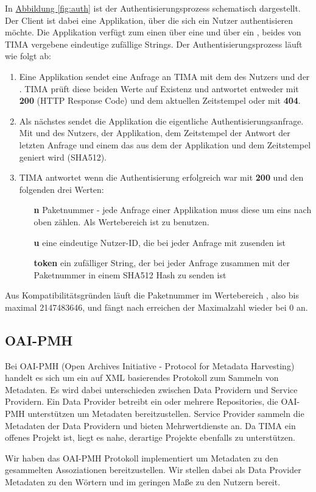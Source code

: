 In \hyperref[fig:auth]{Abbildung \ref*{fig:auth}} ist der Authentisierungsprozess schematisch dargestellt. Der Client ist dabei eine Applikation, über die sich ein Nutzer authentisieren möchte. Die Applikation verfügt zum einen über eine  und über ein , beides von TIMA vergebene eindeutige zufällige Strings. Der Authentisierungsprozess läuft wie folgt ab:
\begin{enumerate}
	\item Eine Applikation sendet eine Anfrage an TIMA mit dem  des Nutzers und der . TIMA prüft diese beiden Werte auf Existenz und antwortet entweder mit \textbf{200} (HTTP Response Code) und dem aktuellen Zeitstempel oder mit \textbf{404}.
	\item Als nächstes sendet die Applikation die eigentliche Authentisierungsanfrage. Mit  und  des Nutzers,  der Applikation, dem Zeitstempel der Antwort der letzten Anfrage und einem  das aus dem  der Applikation und dem Zeitstempel geniert wird (SHA512).
	\item TIMA antwortet wenn die Authentisierung erfolgreich war mit \textbf{200} und den folgenden drei Werten:
	\begin{itemize}
    \item[\textbf{n}] Paketnummer - jede Anfrage einer Applikation muss diese um eins nach oben zählen. Als Wertebereich ist  zu benutzen.
    \item[\textbf{u}] eine eindeutige Nutzer-ID, die bei jeder Anfrage mit zusenden ist
    \item[\textbf{token}] ein zufälliger String, der bei jeder Anfrage zusammen mit der Paketnummer  in einem SHA512 Hash zu senden ist
	\end{itemize}
\end{enumerate}

Aus Kompatibilitätsgründen läuft die Paketnummer im Wertebereich , also bis maximal 2147483646, und fängt nach erreichen der Maximalzahl wieder bei 0 an.

\subsection{OAI-PMH}\label{sec:oai-pmh} %
Bei OAI-PMH (Open Archives Initiative - Protocol for Metadata Harvesting) handelt es sich um ein auf XML basierendes Protokoll zum Sammeln von Metadaten. Es wird dabei unterschieden zwischen Data Providern und Service Providern. Ein Data Provider betreibt ein oder mehrere Repositories, die OAI-PMH unterstützen um Metadaten bereitzustellen. Service Provider sammeln die Metadaten der Data Providern und bieten Mehrwertdienste an. Da TIMA ein offenes Projekt ist, liegt es nahe, derartige Projekte ebenfalls zu unterstützen.

Wir haben das OAI-PMH Protokoll implementiert um Metadaten zu den gesammelten Assoziationen bereitzustellen. Wir stellen dabei als Data Provider Metadaten zu den Wörtern und im geringen Maße zu den Nutzern bereit.
